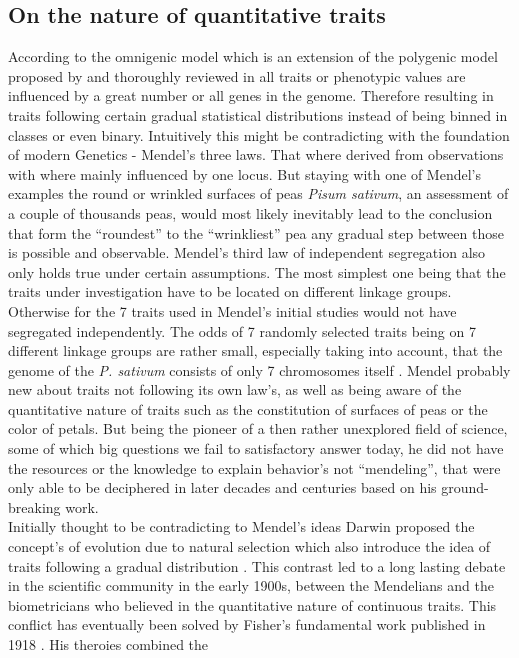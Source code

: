 \subsection{On the nature of quantitative traits}
According to the omnigenic model which is an extension of the polygenic model proposed by \cite{boyle2017expanded} and
thoroughly reviewed in \cite{timpson2018} all traits or phenotypic values are influenced
by a great number or all genes in the genome. Therefore resulting in traits following certain gradual statistical distributions
instead of being binned in classes or even binary. Intuitively this might be contradicting with the foundation of modern Genetics -
Mendel's three laws. That where derived from observations with where mainly influenced by one locus. But staying with one of
Mendel's examples the round or wrinkled surfaces of  peas \textit{Pisum sativum}, an assessment of a couple of thousands peas, would
most likely inevitably
lead to the conclusion that form the ``roundest'' to the ``wrinkliest'' pea any gradual step between those is possible and observable.
Mendel's third law of independent segregation also only holds true under certain assumptions. The most simplest one being that the traits
under investigation have to be located on different linkage groups. Otherwise for the 7 traits used in Mendel's initial studies would not have
segregated independently. The odds of 7 randomly selected traits being on 7 different linkage groups are rather small, especially taking
into account, that the genome of the \textit{P. sativum} consists of only 7 chromosomes itself \cite{kalo2004}. Mendel probably new about
traits not following its own law's,
as well as being aware of the quantitative nature of traits such as the constitution of surfaces of peas or the color of petals. But being the
pioneer of a then rather unexplored field of science, some of which big questions we fail to satisfactory answer today, he did not have the
resources or the knowledge to explain behavior's not ``mendeling'', that were only able to be deciphered in later decades and centuries
based on his ground-breaking work.  \\
Initially thought to be contradicting to Mendel's ideas Darwin proposed the concept's of evolution due to natural selection which also
introduce the idea of traits following a gradual distribution \cite{darwin1859}. This contrast led to a long lasting debate in the
scientific community in the early 1900s, between the Mendelians and the biometricians who believed in the quantitative nature of continuous
traits. This conflict has eventually been solved by Fisher's fundamental work published in 1918 \cite{fisher1919xv}. His theroies combined the
